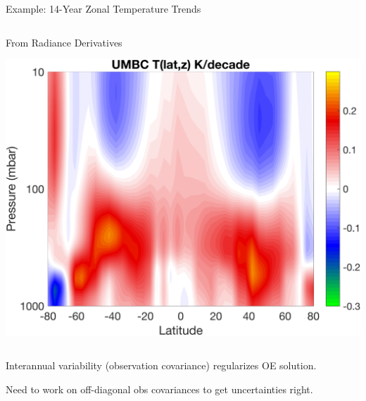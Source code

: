 \documentclass[10pt,t]{beamer}
\begin{document}
\begin{frame}[label={sec:orgfb121a1}]{Example: 14-Year Zonal Temperature Trends}
\begin{columns}
\begin{column}{0.55\columnwidth}
\begin{block}{\footnotesize From Radiance Derivatives}
\begin{center}
\includegraphics[width=\linewidth]{./oFigs/final_umbc_t_zoom_cmap.png}
\end{center}
\end{block}
\end{column}
\end{columns}

Interannual variability (observation covariance) regularizes OE solution.

Need to work on off-diagonal obs covariances to get uncertainties right.
\end{frame}
\end{document}
